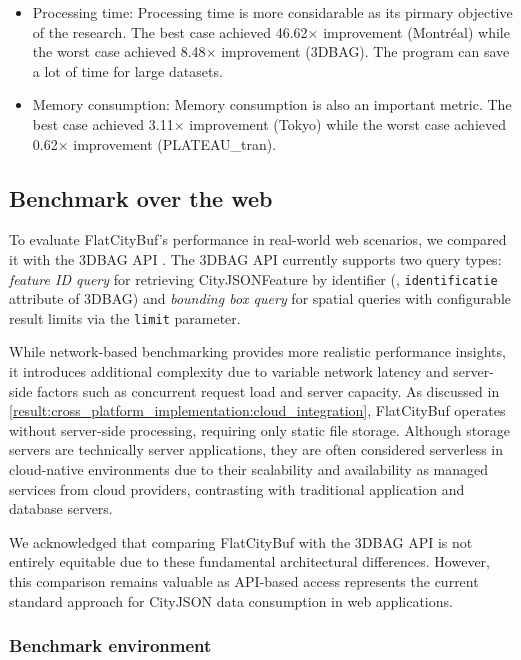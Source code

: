 \begin{itemize}
  \item Processing time: Processing time is more considarable as its pirmary objective of the research. The best case achieved 46.62$\times$ improvement (Montréal) while the worst case achieved 8.48$\times$ improvement (3DBAG). The program can save a lot of time for large datasets.
  \item Memory consumption: Memory consumption is also an important metric. The best case achieved 3.11$\times$ improvement (Tokyo) while the worst case achieved 0.62$\times$ improvement (PLATEAU\_tran).
\end{itemize}

\subsection{Benchmark over the web}
\label{result:benchmark_over_the_web}

To evaluate FlatCityBuf's performance in real-world web scenarios, we compared it with the 3DBAG API \citep{3dbag_api}. The 3DBAG API currently supports two query types: \textit{feature ID query} for retrieving CityJSONFeature by identifier (\eg, \texttt{identificatie} attribute of 3DBAG) and \textit{bounding box query} for spatial queries with configurable result limits via the \texttt{limit} parameter.

While network-based benchmarking provides more realistic performance insights, it introduces additional complexity due to variable network latency and server-side factors such as concurrent request load and server capacity. As discussed in \autoref{result:cross_platform_implementation:cloud_integration}, FlatCityBuf operates without server-side processing, requiring only static file storage. Although storage servers are technically server applications, they are often considered serverless in cloud-native environments due to their scalability and availability as managed services from cloud providers, contrasting with traditional application and database servers.

We acknowledged that comparing FlatCityBuf with the 3DBAG API is not entirely equitable due to these fundamental architectural differences. However, this comparison remains valuable as API-based access represents the current standard approach for CityJSON data consumption in web applications.

\subsubsection{Benchmark environment}
\label{result:benchmark_over_the_web:benchmark_environment}


